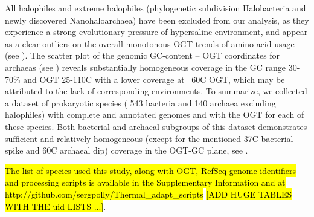 \documentclass[10pt,letterpaper]{article}
\begin{document}
All halophiles and extreme halophiles (phylogenetic subdivision Halobacteria and newly discovered Nanohaloarchaea) have been excluded from our analysis, as they experience a strong evolutionary pressure of hypersaline environment, and appear as a clear outliers on the overall monotonous OGT-trends of amino acid usage (see ). The scatter plot of the genomic GC-content -- OGT coordinates for archaeas (see ) reveals substantially homogeneous coverage in the GC range 30-70\% and OGT 25-110C with a lower coverage at ~60C OGT, which may be attributed to the lack of corresponding environments. To summarize, we collected a dataset of prokaryotic species ( 543 bacteria and 140 archaea excluding halophiles) with complete and annotated genomes and with the OGT for each of these species. Both bacterial and archaeal subgroups of this dataset demonstrates sufficient and relatively homogeneous (except for the mentioned 37C bacterial spike and 60C archaeal dip) coverage in the OGT-GC plane, see .

\hl{ The list of species used this study, along with OGT, RefSeq genome identifiers and processing scripts is available in the Supplementary Information and at http://github.com/sergpolly/Thermal\_adapt\_scripts} \hl{[ADD HUGE TABLES WITH THE uid LISTS ...]}.


\end{document}
